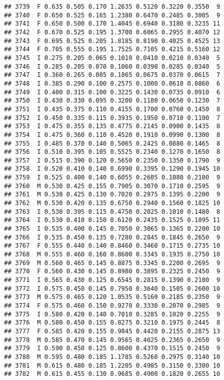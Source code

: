 \documentclass[
]{article}
\begin{document}
\begin{verbatim}
## 3739  F 0.635 0.505 0.170 1.2635 0.5120 0.3220 0.3550  9
## 3740  F 0.650 0.525 0.165 1.2380 0.6470 0.2485 0.3005  9
## 3741  F 0.650 0.500 0.170 1.4045 0.6940 0.3180 0.3235 11
## 3742  F 0.670 0.525 0.195 1.3700 0.6065 0.2955 0.4070 12
## 3743  F 0.695 0.525 0.205 1.8185 0.8190 0.4025 0.4525 13
## 3744  F 0.705 0.555 0.195 1.7525 0.7105 0.4215 0.5160 12
## 3745  I 0.275 0.205 0.065 0.1010 0.0410 0.0210 0.0340  5
## 3746  I 0.285 0.205 0.070 0.1060 0.0390 0.0285 0.0340  5
## 3747  I 0.360 0.265 0.085 0.1865 0.0675 0.0370 0.0615  7
## 3748  I 0.385 0.290 0.100 0.2575 0.1000 0.0610 0.0860  6
## 3749  I 0.400 0.315 0.100 0.3225 0.1430 0.0735 0.0910  6
## 3750  I 0.430 0.330 0.095 0.3200 0.1180 0.0650 0.1230  7
## 3751  I 0.435 0.375 0.110 0.4155 0.1700 0.0760 0.1450  8
## 3752  I 0.450 0.335 0.115 0.3935 0.1950 0.0710 0.1100  7
## 3753  I 0.475 0.355 0.135 0.4775 0.2145 0.0900 0.1435  8
## 3754  I 0.475 0.360 0.110 0.4520 0.1910 0.0990 0.1300  8
## 3755  I 0.485 0.370 0.140 0.5065 0.2425 0.0880 0.1465  8
## 3756  I 0.510 0.395 0.105 0.5525 0.2340 0.1270 0.1650  8
## 3757  I 0.515 0.390 0.120 0.5650 0.2350 0.1350 0.1790  9
## 3758  I 0.520 0.410 0.140 0.6990 0.3395 0.1290 0.1945 10
## 3759  I 0.525 0.400 0.140 0.6055 0.2605 0.1080 0.2100  9
## 3760  M 0.530 0.425 0.155 0.7905 0.3070 0.1710 0.2595  9
## 3761  M 0.530 0.425 0.130 0.7020 0.2975 0.1395 0.2200  9
## 3762  M 0.530 0.420 0.135 0.6750 0.2940 0.1560 0.1825 10
## 3763  I 0.530 0.395 0.115 0.4750 0.2025 0.1010 0.1480  8
## 3764  I 0.530 0.410 0.150 0.6120 0.2435 0.1525 0.1895 11
## 3765  I 0.535 0.400 0.145 0.7050 0.3065 0.1365 0.2200 10
## 3766  I 0.535 0.450 0.135 0.7280 0.2845 0.1845 0.2650  9
## 3767  F 0.555 0.440 0.140 0.8460 0.3460 0.1715 0.2735 10
## 3768  M 0.555 0.460 0.160 0.8600 0.3345 0.1935 0.2750 10
## 3769  M 0.560 0.465 0.145 0.8875 0.3345 0.2200 0.2695  9
## 3770  F 0.560 0.430 0.145 0.8980 0.3895 0.2325 0.2450  9
## 3771  I 0.565 0.430 0.125 0.6545 0.2815 0.1390 0.2100  9
## 3772  I 0.575 0.450 0.145 0.7950 0.3640 0.1505 0.2600 10
## 3773  M 0.575 0.465 0.120 1.0535 0.5160 0.2185 0.2350  9
## 3774  F 0.575 0.460 0.150 0.9270 0.3330 0.2070 0.2985  9
## 3775  I 0.580 0.420 0.140 0.7010 0.3285 0.1020 0.2255  9
## 3776  M 0.580 0.450 0.155 0.8275 0.3210 0.1975 0.2445  8
## 3777  F 0.585 0.420 0.155 0.9845 0.4420 0.2155 0.2875 13
## 3778  M 0.585 0.470 0.145 0.9565 0.4025 0.2365 0.2650  9
## 3779  I 0.590 0.450 0.125 0.8600 0.4370 0.1515 0.2450  9
## 3780  M 0.595 0.480 0.185 1.1785 0.5260 0.2975 0.3140 10
## 3781  M 0.615 0.480 0.185 1.2205 0.4985 0.3150 0.3300 10
## 3782  M 0.615 0.455 0.130 0.9685 0.4900 0.1820 0.2655 10

\end{verbatim}
\end{document}
